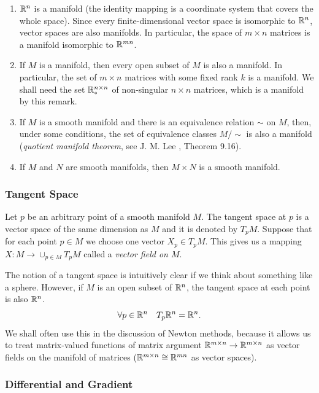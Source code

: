 \begin{enumerate}
    \item $\mathbb{R}^n$ is a manifold (the identity mapping is a coordinate system that
        covers the whole space). Since every finite-dimensional vector space is 
        isomorphic to $\mathbb{R}^n$, vector spaces are also manifolds. In particular,
        the space of $m \times n$ matrices is a manifold isomorphic to $\mathbb{R}^{mn}$.
    \item If $M$ is a manifold, then every open subset of $M$ is also a manifold.
        In particular, the set of $m \times n$ matrices with some fixed rank $k$
        is a manifold. We shall need the set $\mathbb{R}^{n \times n}_{*}$ of non-singular $n \times n$ matrices,
        which is a manifold by this remark.
    \item If $M$ is a smooth manifold and there is an equivalence relation $\sim$ on $M$,
        then, under some conditions, the set of equivalence classes $M / \sim$ is 
        also a manifold (\textit{quotient manifold theorem}, see J. M. Lee \cite{lee_manifolds}, Theorem 9.16).
    \item If $M$ and $N$ are smooth manifolds, then $M \times N$ is a smooth
        manifold.
\end{enumerate}


\subsubsection{Tangent Space}

Let $p$ be an arbitrary point of a smooth manifold $M$. The tangent space at $p$
is a vector space of the same dimension as $M$ and it is denoted by $T_pM$.
Suppose that for each point $p \in M$ we choose one vector $X_p \in T_pM$. 
This gives us a mapping $X: M \to \cup_{p \in M} T_pM$ called a
\textit{vector field on $M$}.


The notion of a tangent space is intuitively clear if we think about something like a sphere.
However, if $M$ is an open subset of $\mathbb{R}^n$, the tangent space at each point
is also $\mathbb{R}^n$.
\begin{equation}
    \forall p \in \mathbb{R}^n \quad T_p\mathbb{R}^n = \mathbb{R}^n.
\end{equation}
We shall often use this in the discussion of Newton methods, because
it allows us to treat matrix-valued functions of matrix argument $\mathbb{R}^{m \times n} \to \mathbb{R}^{m \times n}$
as vector fields on the manifold of matrices ($\mathbb{R}^{m \times n} \cong \mathbb{R}^{mn}$ as vector spaces).


\subsubsection{Differential and Gradient}

